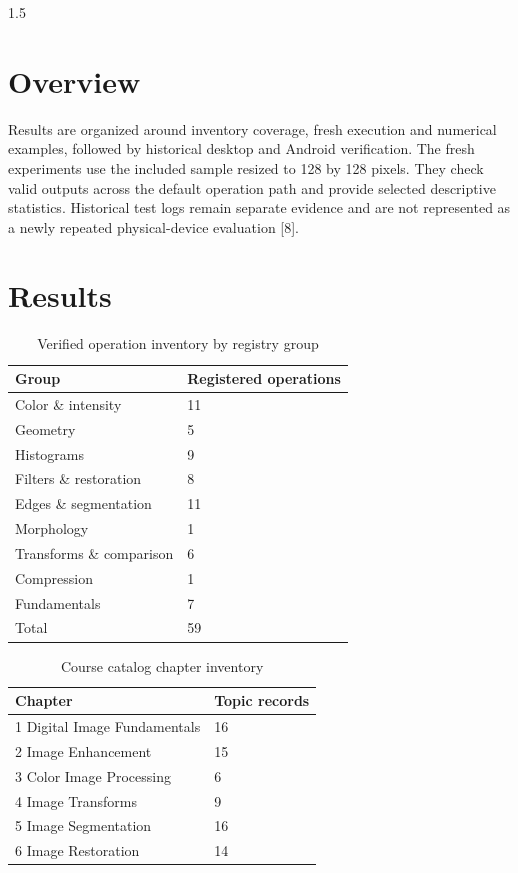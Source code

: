 \begin{spacing}{1.5}
\section{Overview}
Results are organized around inventory coverage, fresh execution and numerical examples, followed by historical desktop and Android verification. The fresh experiments use the included sample resized to 128 by 128 pixels. They check valid outputs across the default operation path and provide selected descriptive statistics. Historical test logs remain separate evidence and are not represented as a newly repeated physical-device evaluation [8].

\section{Results}
\begin{table}[htbp]\centering\small
\caption{Verified operation inventory by registry group}
\begin{tabularx}{\textwidth}{XX}
\toprule
\textbf{Group} & \textbf{Registered operations}\\\midrule
Color \& intensity & 11\\
Geometry & 5\\
Histograms & 9\\
Filters \& restoration & 8\\
Edges \& segmentation & 11\\
Morphology & 1\\
Transforms \& comparison & 6\\
Compression & 1\\
Fundamentals & 7\\
Total & 59\\
\bottomrule\end{tabularx}\end{table}
\begin{table}[htbp]\centering\small
\caption{Course catalog chapter inventory}
\begin{tabularx}{\textwidth}{XX}
\toprule
\textbf{Chapter} & \textbf{Topic records}\\\midrule
1 Digital Image Fundamentals & 16\\
2 Image Enhancement & 15\\
3 Color Image Processing & 6\\
4 Image Transforms & 9\\
5 Image Segmentation & 16\\
6 Image Restoration & 14\\

\end{tabularx}
\end{table}
\end{spacing}

